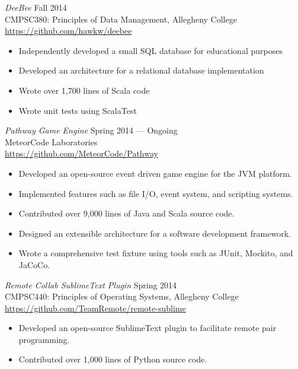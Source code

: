 \documentclass[margin]{res}
\begin{document}
\begin{resume}
        {\sl DeeBee} \hfill Fall 2014 \\
        CMPSC380: Principles of Data Management, Allegheny College \\
        \url{https://github.com/hawkw/deebee}
        \begin{itemize} \itemsep -2pt %
        \item Independently developed a small SQL database for educational purposes
        \item Developed an architecture for a relational database implementation
        \item Wrote over 1,700 lines of Scala code
        \item Wrote unit tests using ScalaTest
        \end{itemize}

        {\sl Pathway Game Engine} \hfill Spring 2014 --- Ongoing \\
                MeteorCode Laboratories \\
        \url{https://github.com/MeteorCode/Pathway}
        \begin{itemize} \itemsep -2pt %
        \item Developed an open-source event driven game engine for the JVM platform.
        \item Implemented features such as file I/O, event system, and scripting systems.
        \item Contributed over 9,000 lines of Java and Scala source code.
        \item Designed an extensible architecture for a software development framework.
        \item Wrote a comprehensive test fixture using tools such as JUnit, Mockito, and JaCoCo.
        \end{itemize}

        {\sl Remote Collab SublimeText Plugin } \hfill Spring 2014 \\
        CMPSC440: Principles of Operating Systems, Allegheny College \\
        \url{https://github.com/TeamRemote/remote-sublime}
        \begin{itemize}  \itemsep -2pt %
            \item Developed an open-source SublimeText plugin to facilitate remote pair programming.
            \item Contributed over 1,000 lines of Python source code.
        \end{itemize}


\end{resume}
\end{document}
